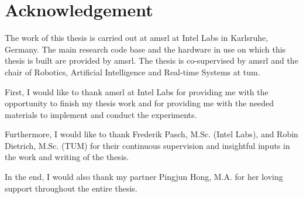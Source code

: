 \chapter{Acknowledgement}\label{ch:ackonwledgement}

The work of this thesis is carried out at \gls{amsrl} at Intel Labs in Karlsruhe, Germany. The main research code base and the hardware in use on which this thesis is built are provided by \gls{amsrl}. The thesis is co-supervised by \gls{amsrl} and the chair of Robotics, Artificial Intelligence and Real-time Systems at \gls{tum}. 

First, I would like to thank \gls{amsrl} at Intel Labs for providing me with the opportunity to finish my thesis work and for providing me with the needed materials to implement and conduct the experiments. 

Furthermore, I would like to thank Frederik Pasch, M.Sc. (Intel Labs), and Robin Dietrich, M.Sc. (TUM) for their continuous supervision and insightful inputs in the work and writing of the thesis. 

In the end, I would also thank my partner Pingjun Hong, M.A. for her loving support throughout the entire thesis. 

